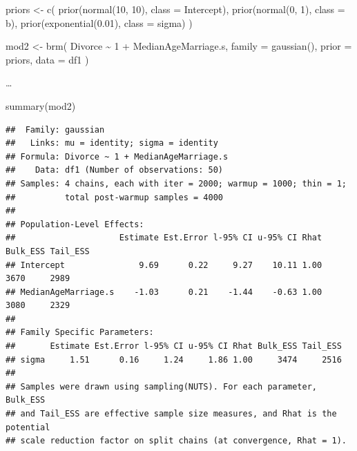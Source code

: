 \documentclass[
  a4paper,11pt,twoside,onecolumn,openright,final,oldfontcommands]{memoir}
\newenvironment{Shaded}{\begin{snugshade}}{\end{snugshade}}
\newcommand{\AttributeTok}[1]{\textcolor[rgb]{0.77,0.63,0.00}{#1}}
\newcommand{\DecValTok}[1]{\textcolor[rgb]{0.00,0.00,0.81}{#1}}
\newcommand{\FloatTok}[1]{\textcolor[rgb]{0.00,0.00,0.81}{#1}}
\newcommand{\FunctionTok}[1]{\textcolor[rgb]{0.00,0.00,0.00}{#1}}
\newcommand{\NormalTok}[1]{#1}
\newcommand{\OtherTok}[1]{\textcolor[rgb]{0.56,0.35,0.01}{#1}}
\newcommand{\SpecialCharTok}[1]{\textcolor[rgb]{0.00,0.00,0.00}{#1}}
\theoremstyle{definition}
\theoremstyle{definition}
\theoremstyle{definition}
\theoremstyle{remark}
\begin{document}
\begin{Shaded}
\begin{Highlighting}[]
\NormalTok{priors }\OtherTok{\textless{}{-}} \FunctionTok{c}\NormalTok{(}
  \FunctionTok{prior}\NormalTok{(}\FunctionTok{normal}\NormalTok{(}\DecValTok{10}\NormalTok{, }\DecValTok{10}\NormalTok{), }\AttributeTok{class =}\NormalTok{ Intercept),}
  \FunctionTok{prior}\NormalTok{(}\FunctionTok{normal}\NormalTok{(}\DecValTok{0}\NormalTok{, }\DecValTok{1}\NormalTok{), }\AttributeTok{class =}\NormalTok{ b),}
  \FunctionTok{prior}\NormalTok{(}\FunctionTok{exponential}\NormalTok{(}\FloatTok{0.01}\NormalTok{), }\AttributeTok{class =}\NormalTok{ sigma)}
\NormalTok{  )}

\NormalTok{mod2 }\OtherTok{\textless{}{-}} \FunctionTok{brm}\NormalTok{(}
\NormalTok{  Divorce }\SpecialCharTok{\textasciitilde{}} \DecValTok{1} \SpecialCharTok{+}\NormalTok{ MedianAgeMarriage.s,}
  \AttributeTok{family =} \FunctionTok{gaussian}\NormalTok{(),}
  \AttributeTok{prior =}\NormalTok{ priors,}
  \AttributeTok{data =}\NormalTok{ df1}
\NormalTok{  )}
\end{Highlighting}
\end{Shaded}

\ldots{}

\begin{Shaded}
\begin{Highlighting}[]
\FunctionTok{summary}\NormalTok{(mod2)}
\end{Highlighting}
\end{Shaded}

\begin{verbatim}
##  Family: gaussian 
##   Links: mu = identity; sigma = identity 
## Formula: Divorce ~ 1 + MedianAgeMarriage.s 
##    Data: df1 (Number of observations: 50) 
## Samples: 4 chains, each with iter = 2000; warmup = 1000; thin = 1;
##          total post-warmup samples = 4000
## 
## Population-Level Effects: 
##                     Estimate Est.Error l-95% CI u-95% CI Rhat Bulk_ESS Tail_ESS
## Intercept               9.69      0.22     9.27    10.11 1.00     3670     2989
## MedianAgeMarriage.s    -1.03      0.21    -1.44    -0.63 1.00     3080     2329
## 
## Family Specific Parameters: 
##       Estimate Est.Error l-95% CI u-95% CI Rhat Bulk_ESS Tail_ESS
## sigma     1.51      0.16     1.24     1.86 1.00     3474     2516
## 
## Samples were drawn using sampling(NUTS). For each parameter, Bulk_ESS
## and Tail_ESS are effective sample size measures, and Rhat is the potential
## scale reduction factor on split chains (at convergence, Rhat = 1).
\end{verbatim}
\end{document}
